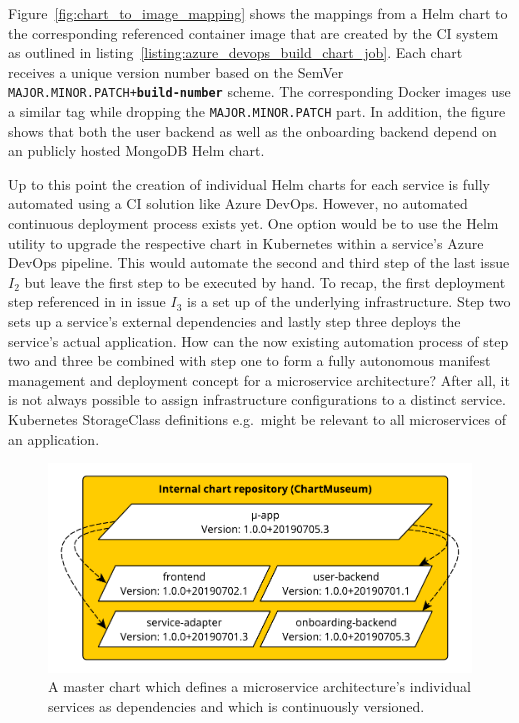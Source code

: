 Figure~\ref{fig:chart_to_image_mapping} shows the mappings from a Helm chart to
the corresponding referenced container image that are created by the \ac{CI}
system as outlined in listing~\ref{listing:azure_devops_build_chart_job}. Each
chart receives a unique version number based on the SemVer
\texttt{MAJOR.MINOR.PATCH+\textbf{build-number}} scheme. The corresponding
Docker images use a similar tag while dropping the \texttt{MAJOR.MINOR.PATCH}
part. In addition, the figure shows that both the user backend as well as the
onboarding backend depend on an publicly hosted MongoDB Helm chart.

Up to this point the creation of individual Helm charts for each service is
fully automated using a \ac{CI} solution like Azure DevOps. However, no
automated continuous deployment process exists yet. One option would be to use
the Helm utility to upgrade the respective chart in Kubernetes within a
service's Azure DevOps pipeline. This would automate the second and third step
of the last issue $I_2$ but leave the first step to be executed by hand. To
recap, the first deployment step referenced in in issue $I_3$ is a set up of
the underlying infrastructure. Step two sets up a service's external
dependencies and lastly step three deploys the service's actual application.
How can the now existing automation process of step two and three be combined
with step one to form a fully autonomous manifest management and deployment
concept for a microservice architecture? After all, it is not always possible
to assign infrastructure configurations to a distinct service. Kubernetes
StorageClass definitions e.g.\ might be relevant to all microservices of an
application.

\begin{figure}[H]
\begin{center}
  \includegraphics[scale=0.7]{images/figures/master_chart.pdf}
\end{center}
\caption{A master chart which defines a microservice architecture's individual
services as dependencies and which is continuously versioned.}%
\label{fig:master_chart}
\end{figure}

